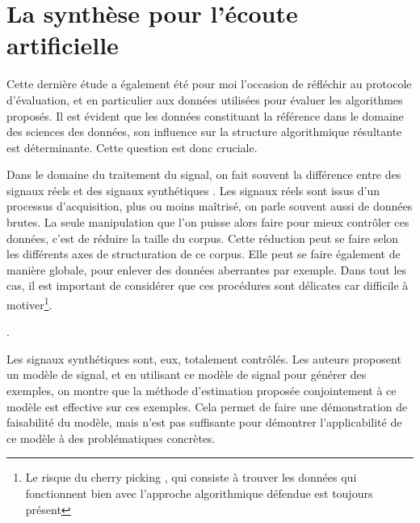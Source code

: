 \section{La synthèse pour l'écoute artificielle} \label{sec:dcase}

Cette dernière étude a également été pour moi l'occasion de réfléchir au protocole d'évaluation, et en particulier aux données utilisées pour évaluer les algorithmes proposés. Il est évident que les données constituant la référence dans le domaine des sciences des données, son influence sur la structure algorithmique résultante est déterminante. Cette question est donc cruciale.

Dans le domaine du traitement du signal, on fait souvent la différence entre des signaux \og réels \fg et des signaux \og synthétiques \fg. Les signaux réels sont issus d'un processus d'acquisition, plus ou moins maîtrisé, on parle souvent aussi de données brutes. La seule manipulation que l'on puisse alors faire pour mieux contrôler ces données, c'est de réduire la taille du corpus. Cette réduction peut se faire selon les différents axes de structuration de ce corpus. Elle peut se faire également de manière globale, pour enlever des données aberrantes par exemple. Dans tout les cas, il est important de considérer que ces procédures sont délicates car difficile à motiver\footnote{Le risque du \og cherry picking \fg, qui consiste à trouver les données qui fonctionnent bien avec l'approche algorithmique défendue est toujours présent}.

.


Les signaux synthétiques sont, eux, totalement contrôlés. Les auteurs proposent un modèle de signal, et en utilisant ce modèle de signal pour générer des exemples, on montre que la méthode d'estimation proposée conjointement à ce modèle est effective sur ces exemples. Cela permet de faire une démonstration de faisabilité du modèle, mais n'est pas suffisante pour démontrer l'applicabilité de ce modèle à des problématiques concrètes.

